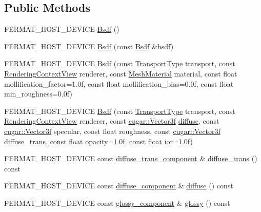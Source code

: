 \subsection*{Public Methods}
\begin{DoxyCompactItemize}
\item 
F\+E\+R\+M\+A\+T\+\_\+\+H\+O\+S\+T\+\_\+\+D\+E\+V\+I\+CE \hyperlink{struct_bsdf_acaba8d34bd0941ee5f693dfd1332192c}{Bsdf} ()
\item 
F\+E\+R\+M\+A\+T\+\_\+\+H\+O\+S\+T\+\_\+\+D\+E\+V\+I\+CE \hyperlink{struct_bsdf_afab2b86b817583efe5d2e66b51fce894}{Bsdf} (const \hyperlink{struct_bsdf}{Bsdf} \&bsdf)
\item 
F\+E\+R\+M\+A\+T\+\_\+\+H\+O\+S\+T\+\_\+\+D\+E\+V\+I\+CE \hyperlink{struct_bsdf_ae7c0dd3d4267fa567067e4e2218c6a2b}{Bsdf} (const \hyperlink{group___b_s_d_f_module_gaca1e72535e7f260e54ed8bbf984dade9}{Transport\+Type} transport, const \hyperlink{struct_rendering_context_view}{Rendering\+Context\+View} renderer, const \hyperlink{struct_mesh_material}{Mesh\+Material} material, const float mollification\+\_\+factor=1.\+0f, const float mollification\+\_\+bias=0.\+0f, const float min\+\_\+roughness=0.\+0f)
\item 
F\+E\+R\+M\+A\+T\+\_\+\+H\+O\+S\+T\+\_\+\+D\+E\+V\+I\+CE \hyperlink{struct_bsdf_a53df9a2f9d7cf9384ce29d2fe061a383}{Bsdf} (const \hyperlink{group___b_s_d_f_module_gaca1e72535e7f260e54ed8bbf984dade9}{Transport\+Type} transport, const \hyperlink{struct_rendering_context_view}{Rendering\+Context\+View} renderer, const \hyperlink{structcugar_1_1_vector}{cugar\+::\+Vector3f} \hyperlink{struct_bsdf_a2c8d6de3e2d2a7d282d9cd510b8f96aa}{diffuse}, const \hyperlink{structcugar_1_1_vector}{cugar\+::\+Vector3f} specular, const float roughness, const \hyperlink{structcugar_1_1_vector}{cugar\+::\+Vector3f} \hyperlink{struct_bsdf_a12d8619f56cc6b28b1e1bc6a4ae9d954}{diffuse\+\_\+trans}, const float opacity=1.\+0f, const float ior=1.\+0f)
\item 
F\+E\+R\+M\+A\+T\+\_\+\+H\+O\+S\+T\+\_\+\+D\+E\+V\+I\+CE const \hyperlink{structcugar_1_1_lambert_trans_bsdf}{diffuse\+\_\+trans\+\_\+component} \& \hyperlink{struct_bsdf_a12d8619f56cc6b28b1e1bc6a4ae9d954}{diffuse\+\_\+trans} () const
\item 
F\+E\+R\+M\+A\+T\+\_\+\+H\+O\+S\+T\+\_\+\+D\+E\+V\+I\+CE const \hyperlink{structcugar_1_1_lambert_bsdf}{diffuse\+\_\+component} \& \hyperlink{struct_bsdf_a2c8d6de3e2d2a7d282d9cd510b8f96aa}{diffuse} () const
\item 
F\+E\+R\+M\+A\+T\+\_\+\+H\+O\+S\+T\+\_\+\+D\+E\+V\+I\+CE const \hyperlink{structcugar_1_1_g_g_x_smith_bsdf}{glossy\+\_\+component} \& \hyperlink{struct_bsdf_a7ab1bdf476d9f79b66b32f27d8b99536}{glossy} () const

\end{DoxyCompactItemize}
